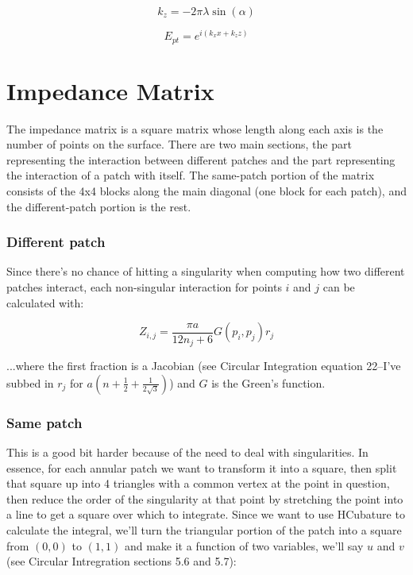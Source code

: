 \documentclass[etd,oneside,senior]{BYUPhys}
\begin{document}
\begin{equation}
  k_{z}=-2\pi\lambda\sin\left(\alpha\right)
\end{equation}

\begin{equation}
  E_{pt}=e^{i\left(k_{x}x+k_{z}z\right)}
\end{equation}



\section{Impedance Matrix}

The impedance matrix is a square matrix whose length along each axis is the number of points on the surface. There are two main sections, the part representing the interaction between different patches and the part representing the interaction of a patch with itself. The same-patch portion of the matrix consists of the 4x4 blocks along the main diagonal (one block for each patch), and the different-patch portion is the rest.

\subsubsection{Different patch}

Since there's no chance of hitting a singularity when computing how two different patches interact, each non-singular interaction for points $i$ and $j$ can be calculated with:

\begin{equation}
  Z_{i,j}=\frac{\pi a}{12n_{j}+6}G\left(p_{i},p_{j}\right)r_{j}
\end{equation}

...where the first fraction is a Jacobian (see Circular Integration equation 22--I've subbed in $r_{j}$ for $a\left(n+\frac{1}{2}+\frac{1}{2\sqrt{3}}\right)$) and $G$ is the Green's function.

\subsubsection{Same patch}
This is a good bit harder because of the need to deal with singularities. In essence, for each annular patch we want to transform it into a square, then split that square up into 4 triangles with a common vertex at the point in question, then reduce the order of the singularity at that point by stretching the point into a line to get a square over which to integrate. Since we want to use HCubature to calculate the integral, we'll turn the triangular portion of the patch into a square from $(0,0)$ to $(1,1)$ and make it a function of two variables, we'll say $u$ and $v$ (see Circular Intregration sections 5.6 and 5.7):
\end{document}
